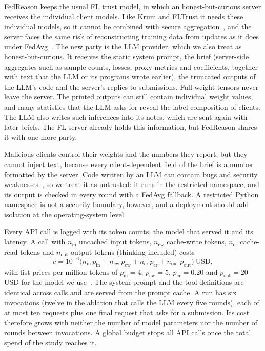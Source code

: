 \documentclass[3p,times,a4paper]{elsarticle}
\begin{document}
FedReason keeps the usual FL trust model, in which an honest-but-curious server receives the individual client models. Like Krum and FLTrust it needs these individual models, so it cannot be combined with secure aggregation~\cite{bonawitz2017practical}, and the server faces the same risk of reconstructing training data from updates as it does under FedAvg~\cite{zhu2019deep}. The new party is the LLM provider, which we also treat as honest-but-curious. It receives the static system prompt, the brief (server-side aggregates such as sample counts, losses, proxy metrics and coefficients, together with text that the LLM or its programs wrote earlier), the truncated outputs of the LLM's code and the server's replies to submissions. Full weight tensors never leave the server. The printed outputs can still contain individual weight values, and many statistics that the LLM asks for reveal the label composition of clients. The LLM also writes such inferences into its notes, which are sent again with later briefs. The FL server already holds this information, but FedReason shares it with one more party.

Malicious clients control their weights and the numbers they report, but they cannot inject text, because every client-dependent field of the brief is a number formatted by the server. Code written by an LLM can contain bugs and security weaknesses~\cite{pearce2022asleep}, so we treat it as untrusted: it runs in the restricted namespace, and its output is checked in every round with a FedAvg fallback. A restricted Python namespace is not a security boundary, however, and a deployment should add isolation at the operating-system level.

Every API call is logged with its token counts, the model that served it and its latency. A call with $n_{\mathrm{in}}$ uncached input tokens, $n_{\mathrm{cw}}$ cache-write tokens, $n_{\mathrm{cr}}$ cache-read tokens and $n_{\mathrm{out}}$ output tokens (thinking included) costs
\begin{equation}
  c=10^{-6}\big(n_{\mathrm{in}}\,p_{\mathrm{in}}+n_{\mathrm{cw}}\,p_{\mathrm{cw}}+n_{\mathrm{cr}}\,p_{\mathrm{cr}}+n_{\mathrm{out}}\,p_{\mathrm{out}}\big)\ \text{USD},
\end{equation}
with list prices per million tokens of $p_{\mathrm{in}}=4$, $p_{\mathrm{cw}}=5$, $p_{\mathrm{cr}}=0.20$ and $p_{\mathrm{out}}=20$ USD for the model we use~\cite{anthropic2026opus55docs}. The system prompt and the tool definitions are identical across calls and are served from the prompt cache. A run has six invocations (twelve in the ablation that calls the LLM every five rounds), each of at most ten requests plus one final request that asks for a submission. Its cost therefore grows with neither the number of model parameters nor the number of rounds between invocations. A global budget stops all API calls once the total spend of the study reaches it.
\end{document}
